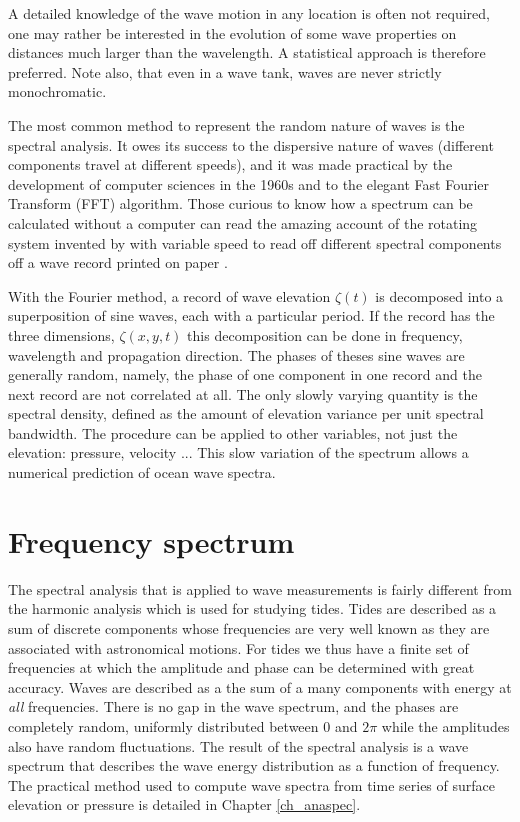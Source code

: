 A detailed knowledge of the wave motion in any location is often not required, 
one may rather be interested in the evolution of some wave properties on distances 
much larger than the wavelength.  A statistical approach is therefore preferred.
Note also, that even in a wave tank, waves are never strictly monochromatic.

The most common method to represent the random nature of waves is the spectral analysis. 
It owes its success to the dispersive nature of waves (different components travel at different speeds), and it was made practical by the 
development of computer sciences in the 1960s and to the elegant 
Fast Fourier Transform (FFT) algorithm.  Those curious to know how a spectrum can be calculated without a computer can read the amazing account 
of the rotating system  invented by  \cite{Barber&al.1946} with variable speed to read off different spectral components off a wave record printed on paper .

With the Fourier method, a record of wave elevation $\zeta(t)$ is decomposed into 
a superposition of sine waves, each with a particular period. If the record has the three dimensions, $\zeta(x,y,t)$ this decomposition can be 
done in frequency, wavelength and propagation direction. 
The phases of theses sine waves are generally random, namely, the phase of one component 
in one record and the next record are not correlated at all. The only slowly varying quantity 
is the spectral density, defined as the amount of elevation variance per unit spectral bandwidth. 
The procedure can be applied to other variables, not just the elevation: pressure, velocity ... 
This slow variation of the spectrum allows a numerical prediction of ocean wave spectra. 

\section{Frequency spectrum}
The spectral analysis that is applied to wave measurements is fairly different from the harmonic 
analysis which is used for studying tides. Tides are described as a sum of discrete components whose frequencies are very well known as 
they are associated with astronomical motions. For tides we thus have a finite set of frequencies at which the amplitude and phase 
can be determined with great accuracy. Waves are described as a the sum of a 
 many components with energy at \emph{all} frequencies. There is no gap in the wave spectrum, and the phases are completely random, uniformly 
distributed between 0 and $2 \pi$ while the amplitudes 
also have random fluctuations. The result of the spectral analysis is a wave spectrum that describes
the wave energy distribution as a function of frequency. The practical method used to compute wave 
spectra from time series of surface elevation or pressure is detailed in Chapter \ref{ch_anaspec}. 

